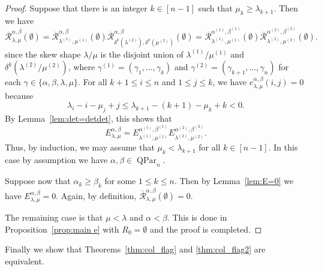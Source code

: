 \documentclass[12pt]{amsart}
\numberwithin{equation}{section}
\theoremstyle{definition}
\newcommand\QPar{\operatorname{QPar}}
\newcommand\lm{{\lambda/\mu}}
\newcommand\R{\mathcal{R}}
\newcommand\oR{\overline{\R}}
\begin{document}
\begin{proof}
  Suppose that there is an integer $k\in[n-1]$ such that $\mu_k\ge
  \lambda_{k+1}$. Then we have
  \[
    \oR_{\lambda,\mu}^{\alpha,\beta}(\emptyset) =
    \oR_{\lambda^{(1)},\mu^{(1)}}^{\alpha,\beta}(\emptyset)
    \oR_{\delta^k(\lambda^{(2)}),\delta^k(\mu^{(2)})}^{\alpha,\beta}(\emptyset)=
    \oR_{\lambda^{(1)},\mu^{(1)}}^{\alpha^{(1)},\beta^{(1)}}(\emptyset)
    \oR_{\lambda^{(2)},\mu^{(2)}}^{\alpha^{(2)},\beta^{(2)}}(\emptyset).
  \]
  since the skew shape $\lm$ is the disjoint union of $\lambda^{(1)}/\mu^{(1)}$
  and $\delta^k(\lambda^{(2)}/\mu^{(2)})$, where $\gamma^{(1)}=(\gamma_1,\dots,\gamma_k)$
  and $\gamma^{(2)}=(\gamma_{k+1},\dots,\gamma_n)$ for each
  $\gamma\in\{\alpha,\beta,\lambda,\mu\}$. 
  For all $k+1\le i\le n$ and $1\le j\le k$, we have
  $e^{\alpha,\beta}_{\lambda,\mu}(i,j)=0$ because
 \[
    \lambda_i-i-\mu_j+j \le \lambda_{k+1}-(k+1)-\mu_k+k <0.
  \]
  By Lemma~\ref{lem:det=detdet}, this shows that
  \[
    E_{\lambda,\mu}^{\alpha,\beta} = E_{\lambda^{(1)},\mu^{(1)}}^{\alpha^{(1)},\beta^{(1)}}
    E_{\lambda^{(2)},\mu^{(2)}}^{\alpha^{(2)},\beta^{(2)}}.
  \]
  Thus, by induction, we may assume that $\mu_k<\lambda_{k+1}$ for all $k\in[n-1]$. In
  this case by assumption we have $\alpha,\beta\in\QPar_n$.

  Suppose now that $\alpha_k\ge\beta_k$ for some $1\le k\le n$. Then by
  Lemma~\ref{lem:E=0} we have $E_{\lambda,\mu}^{\alpha,\beta}=0$. Again, by
  definition, $\oR_{\lambda,\mu}^{\alpha,\beta}(\emptyset)=0$.

  The remaining case is that $\mu<\lambda$ and $\alpha<\beta$. This is done in
  Proposition~\ref{prop:main e} with $R_0=\emptyset$ and the proof is completed.
\end{proof}


Finally we show that Theorems~\ref{thm:col_flag} and \ref{thm:col_flag2} are equivalent.
\end{document}
